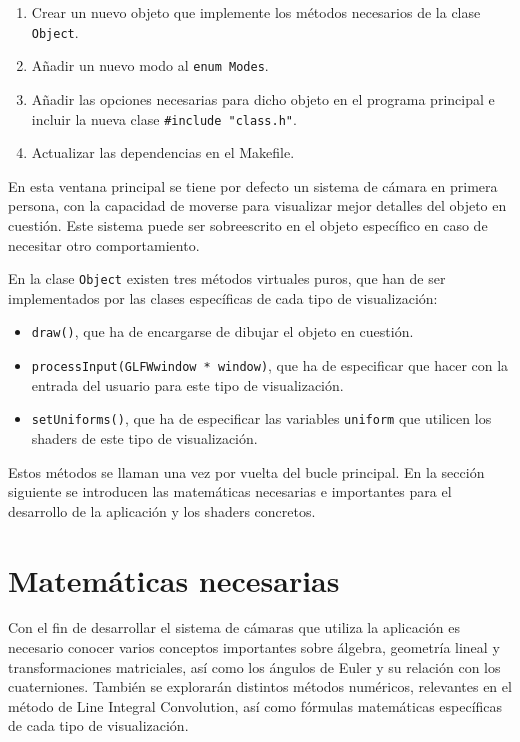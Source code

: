 \begin{enumerate}
		\item Crear un nuevo objeto que implemente los métodos necesarios
				de la clase \verb|Object|.
		\item Añadir un nuevo modo al \verb|enum Modes|.
		\item Añadir las opciones necesarias para dicho objeto en el programa
				principal e incluir la nueva clase \verb|#include "class.h"|.
		\item Actualizar las dependencias en el Makefile.
\end{enumerate}

En esta ventana principal se tiene por defecto un sistema de cámara en primera
persona, con la capacidad de moverse para visualizar mejor detalles del objeto
en cuestión. Este sistema puede ser sobreescrito en el objeto específico en
caso de necesitar otro comportamiento. 

En la clase \verb|Object| existen tres métodos virtuales puros, que han de ser
implementados por las clases específicas de cada tipo de visualización:


\begin{itemize}
		\item \verb|draw()|, que ha de encargarse de dibujar el objeto en
				cuestión.
		\item \verb|processInput(GLFWwindow * window)|, que ha de especificar que
				hacer con la entrada del usuario para este tipo de
				visualización.
		\item \verb|setUniforms()|, que ha de especificar las variables
				\verb|uniform| que utilicen los shaders de este tipo de
				visualización.
\end{itemize}

Estos métodos se llaman una vez por vuelta del bucle principal. En la sección
siguiente se introducen las matemáticas necesarias e importantes para el
desarrollo de la aplicación y los shaders concretos.

\section{Matemáticas necesarias}
\label{makereference5.4}

Con el fin de desarrollar el sistema de cámaras que utiliza la aplicación es
necesario conocer varios conceptos importantes sobre álgebra, geometría lineal y
transformaciones matriciales, así como los ángulos de Euler y su relación con
los cuaterniones. También se explorarán distintos métodos numéricos, relevantes
en el método de Line Integral Convolution, así como fórmulas matemáticas
específicas de cada tipo de visualización.

